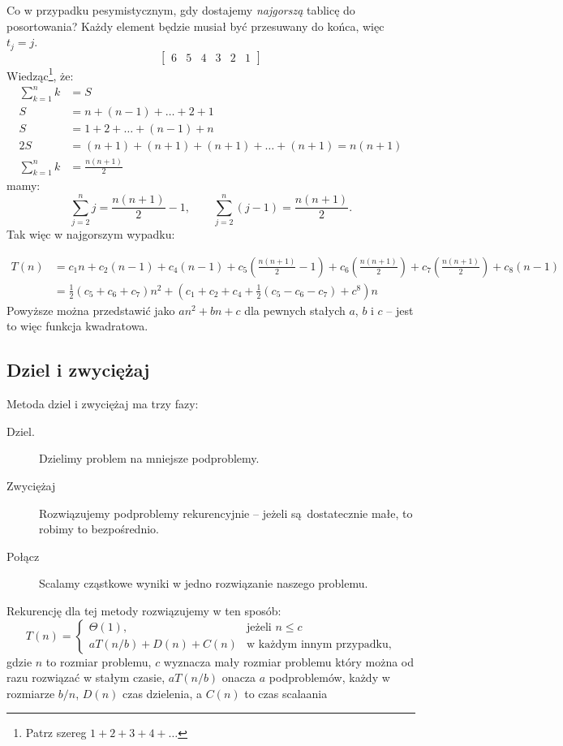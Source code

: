 \documentclass[10pt, oneside]{article}
\theoremstyle{remark}
\begin{document}
Co w przypadku pesymistycznym, gdy dostajemy \emph{najgorszą} tablicę do posortowania? Każdy element będzie musiał być przesuwany do końca, więc $t_j = j$.
$$
\begin{bmatrix}
	6 & 5 & 4 & 3 & 2 & 1
\end{bmatrix}$$
Wiedząc\footnote{Patrz szereg $1+2+3+4+\ldots$}, że:
\begin{align*}
\sum_{k=1}^n k &= S\\
S &= n + (n-1) + \ldots + 2 + 1\\
S &= 1 + 2  + \ldots + (n-1) + n\\
2S &= (n+1) + (n+1) + (n+1) + \ldots + (n+1) = n(n+1)\\
\sum_{k=1}^n k &= \frac{n(n+1)}{2}
\end{align*}
mamy:
$$\sum_{j=2}^n j = \frac{n(n+1)}{2} - 1, \qquad \sum_{j=2}^n \left(j - 1 \right) = \frac{n(n+1)}{2}.$$
Tak więc w najgorszym wypadku:

\begin{align*}
T(n) &= c_{1}n + c_2 (n-1) + c_4 (n-1) + c_5 \left ( \frac{n(n+1)}{2} - 1 \right ) + c_6 \left ( \frac{n(n+1)}{2} \right ) + c_7 \left ( \frac{n(n+1)}{2} \right ) + c_8 (n-1)\\
&= \frac{1}{2} \left(c_5 + c_6 + c_7 \right) n^2 + \left(c_1 + c_2 +c_4 + \frac{1}{2} \left(c_5 - c_6 - c_7\right) + c^8 \right)n
\end{align*}
Powyższe można przedstawić jako $an^2 + bn + c$ dla pewnych stałych $a$, $b$ i $c$ -- jest to więc funkcja kwadratowa.

\subsection{Dziel i zwyciężaj}

Metoda dziel i zwyciężaj ma trzy fazy:
\begin{description}
	\item[Dziel.] Dzielimy problem na mniejsze podproblemy.
	\item[Zwyciężaj] Rozwiązujemy podproblemy rekurencyjnie -- jeżeli są dostatecznie małe, to robimy to bezpośrednio.
	\item[Połącz] Scalamy cząstkowe wyniki w jedno rozwiązanie naszego problemu.
\end{description}

Rekurencję dla tej metody rozwiązujemy w ten sposób:
\begin{equation*}
T(n) = \begin{cases}
\Theta(1), &\text{jeżeli $n \leq c $}\\
aT(n/b) + D(n) + C(n) & \text{w każdym innym przypadku},
\end{cases}
\end{equation*}
gdzie $n$ to rozmiar problemu, $c$ wyznacza mały rozmiar problemu który można od razu rozwiązać w stałym czasie, $aT(n/b)$ onacza $a$ podproblemów, każdy w rozmiarze $b/n$, $D(n)$ czas dzielenia, a $C(n)$ to czas scalaania
\end{document}
